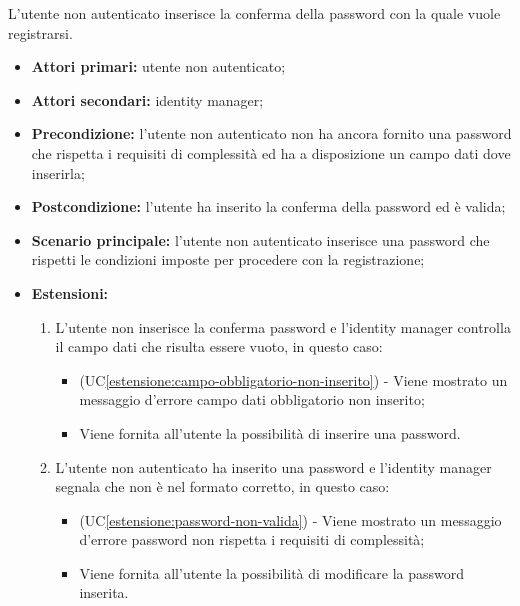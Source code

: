 L'utente non autenticato inserisce la conferma della password con la quale vuole registrarsi.
\begin{itemize}
	\item \textbf{Attori primari:} utente non autenticato;
	\item \textbf{Attori secondari:} identity manager;
	\item \textbf{Precondizione:} l'utente non autenticato non ha ancora fornito una password che rispetta i requisiti di complessità ed ha a disposizione un campo dati dove inserirla;
	\item \textbf{Postcondizione:} l'utente ha inserito la conferma della password ed è valida;
	\item \textbf{Scenario principale:} l'utente non autenticato inserisce una password che rispetti le condizioni imposte per procedere con la registrazione;
	\item \textbf{Estensioni:} 
	\begin{enumerate}[label=\lett]
		\item L'utente non inserisce la conferma password e l'identity manager controlla il campo dati che risulta essere vuoto, in questo caso:
		\begin{itemize}
			\item (UC\ref{estensione:campo-obbligatorio-non-inserito}) - Viene mostrato un messaggio d'errore campo dati obbligatorio non inserito;
			\item Viene fornita all'utente la possibilità di inserire una password.
		\end{itemize}
		\item L'utente non autenticato ha inserito una password e l'identity manager segnala che non è nel formato corretto, in questo caso:
		\begin{itemize}
			\item (UC\ref{estensione:password-non-valida}) - Viene mostrato un messaggio d'errore password non rispetta i requisiti di complessità;
			\item Viene fornita all'utente la possibilità di modificare la password inserita.
		\end{itemize}
	\end{enumerate} 
\end{itemize}

\label{autenticazione-venditore}

